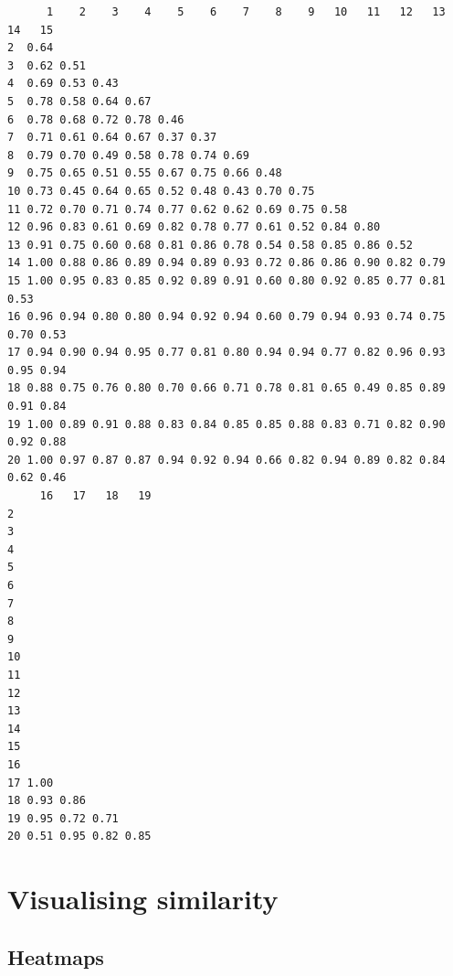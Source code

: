 \documentclass[
  letterpaper,
  DIV=11,
  numbers=noendperiod]{scrreprt}
\begin{document}
\begin{verbatim}
      1    2    3    4    5    6    7    8    9   10   11   12   13   14   15
2  0.64                                                                      
3  0.62 0.51                                                                 
4  0.69 0.53 0.43                                                            
5  0.78 0.58 0.64 0.67                                                       
6  0.78 0.68 0.72 0.78 0.46                                                  
7  0.71 0.61 0.64 0.67 0.37 0.37                                             
8  0.79 0.70 0.49 0.58 0.78 0.74 0.69                                        
9  0.75 0.65 0.51 0.55 0.67 0.75 0.66 0.48                                   
10 0.73 0.45 0.64 0.65 0.52 0.48 0.43 0.70 0.75                              
11 0.72 0.70 0.71 0.74 0.77 0.62 0.62 0.69 0.75 0.58                         
12 0.96 0.83 0.61 0.69 0.82 0.78 0.77 0.61 0.52 0.84 0.80                    
13 0.91 0.75 0.60 0.68 0.81 0.86 0.78 0.54 0.58 0.85 0.86 0.52               
14 1.00 0.88 0.86 0.89 0.94 0.89 0.93 0.72 0.86 0.86 0.90 0.82 0.79          
15 1.00 0.95 0.83 0.85 0.92 0.89 0.91 0.60 0.80 0.92 0.85 0.77 0.81 0.53     
16 0.96 0.94 0.80 0.80 0.94 0.92 0.94 0.60 0.79 0.94 0.93 0.74 0.75 0.70 0.53
17 0.94 0.90 0.94 0.95 0.77 0.81 0.80 0.94 0.94 0.77 0.82 0.96 0.93 0.95 0.94
18 0.88 0.75 0.76 0.80 0.70 0.66 0.71 0.78 0.81 0.65 0.49 0.85 0.89 0.91 0.84
19 1.00 0.89 0.91 0.88 0.83 0.84 0.85 0.85 0.88 0.83 0.71 0.82 0.90 0.92 0.88
20 1.00 0.97 0.87 0.87 0.94 0.92 0.94 0.66 0.82 0.94 0.89 0.82 0.84 0.62 0.46
     16   17   18   19
2                     
3                     
4                     
5                     
6                     
7                     
8                     
9                     
10                    
11                    
12                    
13                    
14                    
15                    
16                    
17 1.00               
18 0.93 0.86          
19 0.95 0.72 0.71     
20 0.51 0.95 0.82 0.85
\end{verbatim}

\section{Visualising similarity}\label{visualising-similarity}

\subsection{Heatmaps}\label{heatmaps}
\end{document}
